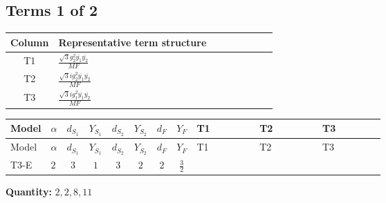 \documentclass[8pt]{article}
\begin{document}
\begin{landscape}
\subsection*{Terms 1 of 2}
\begin{center}
\begin{tabular}{@{}c >{\raggedright\arraybackslash}p{0.82\linewidth}@{}}
\toprule
Column & Representative term structure \\
\midrule
T1 & \(\displaystyle \frac{\sqrt{3} g_{2}^{2} \overline{y_{1}} \overline{y_{2}}}{MF}\) \\
\midrule
T2 & \(\displaystyle \frac{\sqrt{3} i g_{2}^{2} \overline{y_{1}} \overline{y_{2}}}{MF}\) \\
\midrule
T3 & \(\displaystyle \frac{\sqrt{3} i g_{1}^{2} \overline{y_{1}} \overline{y_{2}}}{MF}\) \\
\midrule
\bottomrule
\end{tabular}
\end{center}
\smallskip
\tiny
\begin{longtable}{@{}llcccccc >{\raggedright\arraybackslash}p{0.21\linewidth} >{\raggedright\arraybackslash}p{0.21\linewidth} >{\raggedright\arraybackslash}p{0.21\linewidth}@{}}
\toprule
Model & $\alpha$ & $d_{S_1}$ & $Y_{S_1}$ & $d_{S_2}$ & $Y_{S_2}$ & $d_F$ & $Y_F$ & T1 & T2 & T3 \\
\midrule
\endfirsthead
\toprule
Model & $\alpha$ & $d_{S_1}$ & $Y_{S_1}$ & $d_{S_2}$ & $Y_{S_2}$ & $d_F$ & $Y_F$ & T1 & T2 & T3 \\
\midrule
\endhead
T3-E & $2$ & $3$ & $1$ & $3$ & $2$ & $2$ & $\frac{3}{2}$ & \scriptsize\adjustbox{max width=\linewidth}{$\begin{gathered} - \frac{\sqrt{3} g_{2}^{2} \overline{y_{1}} \overline{y_{2}}}{6 MF}\end{gathered}$} & \scriptsize\adjustbox{max width=\linewidth}{$\begin{gathered} - \frac{11 \sqrt{3} i g_{2}^{2} \overline{y_{1}} \overline{y_{2}}}{8 MF}\end{gathered}$} & \scriptsize\adjustbox{max width=\linewidth}{$\begin{gathered} - \frac{9 \sqrt{3} i g_{1}^{2} \overline{y_{1}} \overline{y_{2}}}{8 MF}\end{gathered}$} \\
\midrule
\bottomrule
\end{longtable}
\clearpage
\noindent\textbf{Quantity: }$\mathrm{2,2,8,11}$\par\smallskip

\end{landscape}
\end{document}

